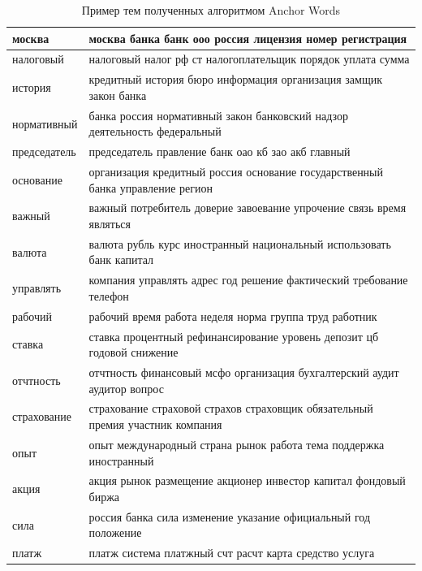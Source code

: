 \documentclass[a4paper, 14pt]{extarticle}
\begin{document}
\newpage
\begin{landscape}
	\begin{small}
		\begin{singlespace}
			\begin{table}[h]
			\centering
			\caption{Пример тем полученных алгоритмом Anchor Words}
			\label{my-label}
				\begin{tabular}{|l|l|}
				\hline
				москва &   москва банка банк ооо россия лицензия номер регистрация \\ \hline
				налоговый &   налоговый налог рф ст налогоплательщик порядок уплата сумма \\ \hline
				история &   кредитный история бюро информация организация замщик закон банка \\ \hline
				нормативный &   банка россия нормативный закон банковский надзор деятельность федеральный \\ \hline
				председатель &   председатель правление банк оао кб зао акб главный \\ \hline
				основание &   организация кредитный россия основание государственный банка управление регион \\ \hline
				важный &   важный потребитель доверие завоевание упрочение связь время являться \\ \hline
				валюта &   валюта рубль курс иностранный национальный использовать банк капитал \\ \hline
				управлять &   компания управлять адрес год решение фактический требование телефон \\ \hline
				рабочий &   рабочий время работа неделя норма группа труд работник \\ \hline
				ставка &   ставка процентный рефинансирование уровень депозит цб годовой снижение \\ \hline
				отчтность &   отчтность финансовый мсфо организация бухгалтерский аудит аудитор вопрос \\ \hline
				страхование &   страхование страховой страхов страховщик обязательный премия участник компания \\ \hline
				опыт &   опыт международный страна рынок работа тема поддержка иностранный \\ \hline
				акция &   акция рынок размещение акционер инвестор капитал фондовый биржа \\ \hline
				сила &   россия банка сила изменение указание официальный год положение \\ \hline
				платж &   платж система платжный счт расчт карта средство услуга \\ \hline

\end{tabular}
\end{table}
\end{singlespace}
\end{small}
\end{landscape}
\end{document}
